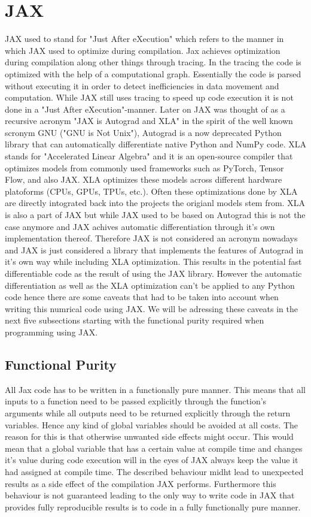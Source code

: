 \documentclass[a4paper, oneside]{discothesis}
\begin{document}
\section{JAX}
JAX used to stand for "Just After eXecution" which refers to the manner in which JAX used to optimize during compilation.
Jax achieves optimization during compilation along other things through tracing.
In the tracing the code is optimized with the help of a computational graph.
Essentially the code is parsed without executing it in order to detect inefficiencies in data movement and computation.
While JAX still uses tracing to speed up code execution it is not done in a "Just After eXecution"-manner.
Later on JAX was thought of as a recursive acronym "JAX is Autograd and XLA" in the spirit of the well known scronym GNU ("GNU is Not Unix"),
Autograd is a now deprecated Python library that can automatically differentiate native Python and NumPy code.
XLA stands for "Accelerated Linear Algebra" and it is an open-source compiler that optimizes models from commonly used frameworks such as PyTorch, Tensor Flow, and also JAX.
XLA optimizes these models across different hardware platoforms (CPUs, GPUs, TPUs, etc.).
Often these optimizations done by XLA are directly intograted back into the projects the origianl models stem from.
XLA is also a part of JAX but while JAX used to be based on Autograd this is not the case anymore and JAX achives automatic differentiation through it's own implementation thereof.
Therefore JAX is not considered an acronym nowadays and JAX is just considered a library that implements the features of Autograd in it's own way while including XLA optimization.
This results in the potential fast differentiable code as the result of using the JAX library.
However the automatic differentiation as well as the XLA optimization can't be applied to any Python code hence there are some caveats that had to be taken into account when writing this numrical code using JAX.
We will be adressing these caveats in the next five subsections starting with the functional purity required when programming using JAX.

\subsection{Functional Purity}
All Jax code has to be written in a functionally pure manner.
This means that all inputs to a function need to be passed explicitly through the function's arguments while all outputs need to be returned explicitly through the return variables.
Hence any kind of global variables should be avoided at all costs.
The reason for this is that otherwise unwanted side effects might occur.
This would mean that a global variable that has a certain value at compile time and changes it's value during code execution will in the eyes of JAX always keep the value it had assigned at compile time.
The described behaviour midht lead to unexpected results as a side effect of the compilation JAX performs.
Furthermore this behaviour is not guaranteed leading to the only way to write code in JAX that provides fully reproducible results is to code in a fully functionally pure manner.
\end{document}
